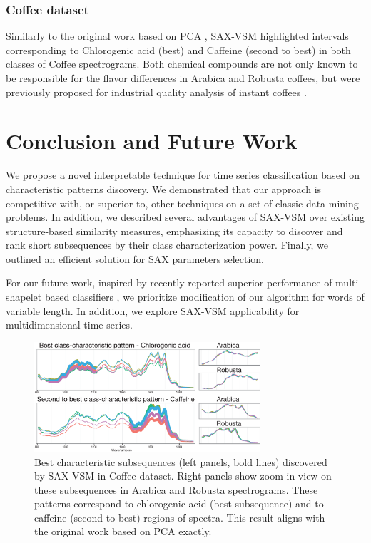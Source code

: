 \documentclass[conference]{IEEEtran}
\begin{document}
\subsubsection{Coffee dataset}
Similarly to the original work based on PCA \cite{coffee}, SAX-VSM highlighted intervals 
corresponding to Chlorogenic acid (best) and Caffeine (second to best) 
in both classes of Coffee spectrograms. Both chemical compounds are 
not only known to be responsible for the flavor differences in 
Arabica and Robusta coffees, but were previously proposed for industrial 
quality analysis of instant coffees \cite{coffee}.

\section{Conclusion and Future Work} \label{conclusion}
We propose a novel interpretable technique for time series classification
based on characteristic patterns discovery. 
We demonstrated that our approach is competitive with, or superior to, 
other techniques on a set of classic data mining problems. 
In addition, we described several advantages of SAX-VSM over existing structure-based 
similarity measures, emphasizing its capacity to discover and rank short subsequences by 
their class characterization power. 
Finally, we outlined an efficient solution for SAX parameters selection.

For our future work, inspired by recently reported superior performance of multi-shapelet based 
classifiers \cite{bagnal}, we prioritize modification of our algorithm for words of variable length.
In addition, we explore SAX-VSM applicability for multidimensional time series. 


\begin{figure}[t]
   \centering
   \vspace{-0.18cm}
   \includegraphics[width=84mm]{figures/coffee_patterns.eps}
   \caption{
   Best characteristic subsequences (left panels, bold lines) discovered by SAX-VSM in
   {Coffee dataset}. Right panels show zoom-in view on these subsequences in Arabica
   and Robusta spectrograms.
   These patterns correspond to chlorogenic acid (best subsequence) 
   and to caffeine (second to best) regions of spectra. This result aligns with
   the original work based on PCA \cite{coffee} exactly.
   }
   \label{fig:coffee}
   \vspace{-0.2cm}
\end{figure}
\end{document}

